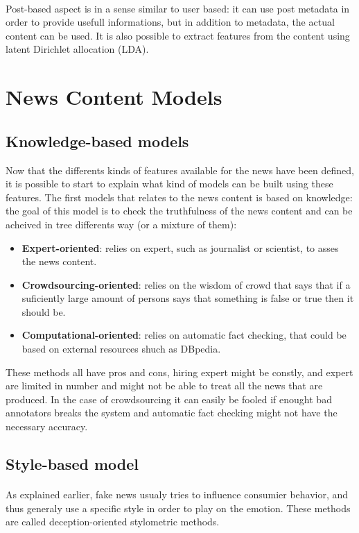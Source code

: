 \paragraph{} Post-based aspect is in a sense similar to user based: it can use post metadata in order to provide usefull informations, but in addition to metadata, the actual content can be used. It is also possible to extract features from the content using latent Dirichlet allocation (LDA)\cite{blei2003latent}.

\section{News Content Models} \label{intro:models}
\subsection{Knowledge-based models}
Now that the differents kinds of features available for the news have been defined, it is possible to start to explain what kind of models can be built using these features. The first models that relates to the news content is based on knowledge: the goal of this model is to check the truthfulness of the news content and can be acheived in tree differents way (or a mixture of them):

\begin{itemize}
	\item \textbf{Expert-oriented}: relies on expert, such as journalist or scientist, to asses the news content.
	\item \textbf{Crowdsourcing-oriented}: relies on the wisdom of crowd that says that if a suficiently large amount of persons says that something is false or true then it should be.
	\item \textbf{Computational-oriented}: relies on automatic fact checking, that could be based on external resources shuch as DBpedia.
\end{itemize}
These methods all have pros and cons, hiring expert might be constly, and expert are limited in number and might not be able to treat all the news that are produced. In the case of crowdsourcing it can easily be fooled if enought bad annotators breaks the system and automatic fact checking might not have the necessary accuracy.

\subsection{Style-based model}
\paragraph{} As explained earlier, fake news usualy tries to influence consumier behavior, and thus generaly use a specific style in order to play on the emotion. These methods are called deception-oriented stylometric methods.

